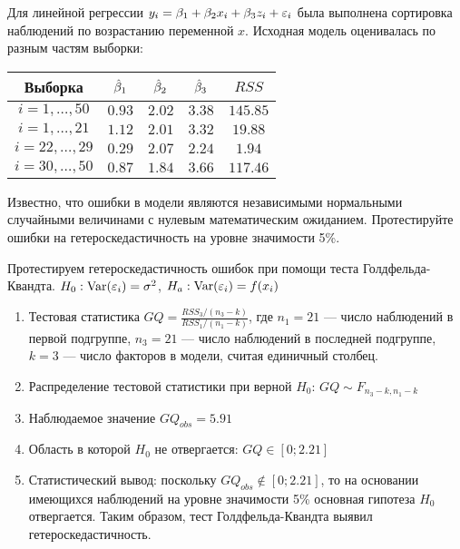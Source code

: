 \documentclass[pdftex,11pt,openany]{book}\usepackage[]{graphicx}\usepackage[]{color}
\begin{document}
\begin{problem}
Для линейной регрессии $y_i = \beta_1 + \beta_2 x_i + \beta_3 z_i + \varepsilon_i$ была выполнена сортировка наблюдений по возрастанию переменной $x$. Исходная модель оценивалась по разным частям выборки:

\begin{tabular}{c|cccc}
Выборка & $\hat{\beta}_1$ & $\hat{\beta}_2$ & $\hat{\beta}_3$ & $RSS$ \\

\hline 
$i=1,\ldots, 50$ & $0.93$ & $2.02$ & $3.38$ & $145.85$ \\ 
$i=1,\ldots, 21$ & $1.12$ & $2.01$ & $3.32$ & $19.88$ \\ 
$i=22,\ldots, 29$ & $0.29$ & $2.07$ & $2.24$ & $1.94$ \\ 
$i=30,\ldots, 50$ & $0.87$ & $1.84$ & $3.66$ & $117.46$ \\ 
\end{tabular} 

Известно, что ошибки в модели являются независимыми нормальными случайными величинами с нулевым математическим ожиданием. Протестируйте
ошибки на гетероскедастичность на уровне значимости 5\%.
\end{problem}
\begin{solution}
Протестируем гетероскедастичность ошибок при помощи теста Голдфельда-
Квандта. $H_0: \operatorname{Var}(\varepsilon_i)=\sigma^2$, $H_a: \operatorname{Var}(\varepsilon_i)=f(x_i)$

\begin{enumerate}
\item Тестовая статистика $GQ=\frac{RSS_3/(n_3-k)}{RSS_1/(n_1-k)}$, где $n_1=21$ --- число наблюдений в первой подгруппе, $n_3=21$ --- число наблюдений в
последней подгруппе, $k=3$ --- число факторов в модели, считая единичный столбец.
\item Распределение тестовой статистики при верной $H_0$: $GQ\sim F_{n_3-k,n_1-k}$
\item Наблюдаемое значение $GQ_{obs}=5.91$
\item Область в которой $H_0$ не отвергается: $GQ\in [0;2.21]$
\item Статистический вывод: поскольку $GQ_{obs} \notin [0;2.21]$, то на основании имеющихся наблюдений на уровне значимости 5\% основная гипотеза $H_0$ отвергается. Таким образом, тест Голдфельда-Квандта выявил гетероскедастичность.
\end{enumerate} 
\end{solution}
\end{document}

